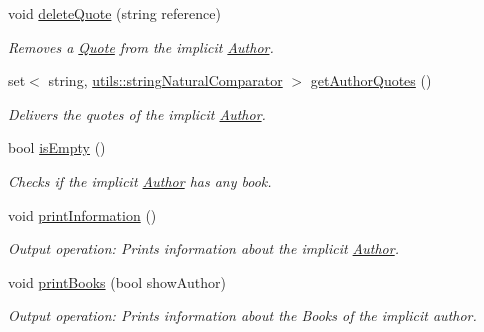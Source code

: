 \begin{DoxyCompactItemize}
void \hyperlink{class_author_a41078931f76f02641f92521a3da5b286}{delete\+Quote} (string reference)
\begin{DoxyCompactList}\small\item\em Removes a \hyperlink{class_quote}{Quote} from the implicit \hyperlink{class_author}{Author}. \end{DoxyCompactList}\item 
set$<$ string, \hyperlink{structutils_1_1string_natural_comparator}{utils\+::string\+Natural\+Comparator} $>$ \hyperlink{class_author_a4cd2ed9766a907b50b4779987d7b98dd}{get\+Author\+Quotes} ()
\begin{DoxyCompactList}\small\item\em Delivers the quotes of the implicit \hyperlink{class_author}{Author}. \end{DoxyCompactList}\item 
bool \hyperlink{class_author_ab0752a3f061a07c6460e52e4386ea5c3}{is\+Empty} ()
\begin{DoxyCompactList}\small\item\em Checks if the implicit \hyperlink{class_author}{Author} has any book. \end{DoxyCompactList}\item 
void \hyperlink{class_author_a9dff52e2a8bd67ff4509eb00f9235155}{print\+Information} ()
\begin{DoxyCompactList}\small\item\em Output operation\+: Prints information about the implicit \hyperlink{class_author}{Author}. \end{DoxyCompactList}\item 
void \hyperlink{class_author_a01c49b9a75e0651c9ebbe4e841d18ae9}{print\+Books} (bool show\+Author)
\begin{DoxyCompactList}\small\item\em Output operation\+: Prints information about the Books of the implicit author. \end{DoxyCompactList}\end{DoxyCompactItemize}
